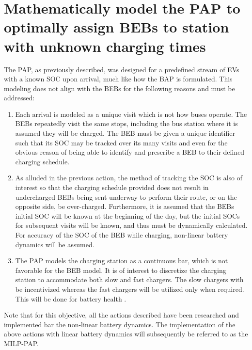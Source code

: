 \documentclass[ee,msthesis]{usuthesis}
\begin{document}
\section{Mathematically model the PAP to optimally assign BEBs to station with unknown charging times}
\label{sec:org1792624}
The PAP, as previously described, was designed for a predefined stream of EVs with a known SOC upon arrival, much like
how the BAP is formulated. This modeling does not align with the BEBs for the following reasons and must be addressed:

\begin{enumerate}
\item Each arrival is modeled as a unique visit which is not how buses operate. The BEBs repeatedly visit the same stops,
including the bus station where it is assumed they will be charged. The BEB must be given a unique identifier such
that its SOC may be tracked over its many visits and even for the obvious reason of being able to identify and
prescribe a BEB to their defined charging schedule.

\item As alluded in the previous action, the method of tracking the SOC is also of interest so that the charging schedule
provided does not result in undercharged BEBs being sent underway to perform their route, or on the opposite side, be
over-charged. Furthermore, it is assumed that the BEBs initial SOC will be known at the beginning of the day, but the
initial SOCs for subsequent visits will be known, and thus must be dynamically calculated. For accuracy of the SOC of
the BEB while charging, non-linear battery dynamics will be assumed.

\item The PAP models the charging station as a continuous bar, which is not favorable for the BEB model. It is of interest
to discretize the charging station to accommodate both slow and fast chargers. The slow chargers with be incentivized
whereas the fast chargers will be utilized only when required. This will be done for battery health
\cite{motapon-2020-gener-cycle}.
\end{enumerate}

Note that for this objective, all the actions described have been researched and implemented bar the non-linear
battery dynamics. The implementation of the above actions with linear battery dynamics will subsequently be referred to
as the MILP-PAP.
\end{document}
